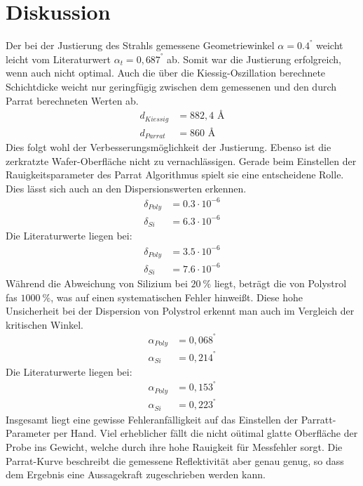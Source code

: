 \section{Diskussion}
\label{sec:Diskussion}

Der bei der Justierung des Strahls gemessene Geometriewinkel $\alpha = 0.4^°$ weicht leicht vom Literaturwert $\alpha_{t} = 0,687^°$ ab.
Somit war die Justierung erfolgreich, wenn auch nicht optimal.
Auch die über die Kiessig-Oszillation berechnete Schichtdicke weicht nur geringfügig zwischen dem gemessenen 
und den durch Parrat berechneten Werten ab.
\begin{align*}
    d_{Kiessig} &= 882,4 \text{ \AA} \\
    d_{Parrat} &= 860 \text{ \AA}
\end{align*}
Dies folgt wohl der Verbesserungsmöglichkeit der Justierung.
Ebenso ist die zerkratzte Wafer-Oberfläche nicht zu vernachlässigen.
Gerade beim Einstellen der Rauigkeitsparameter des Parrat Algorithmus spielt sie eine entscheidene Rolle.
Dies lässt sich auch an den Dispersionswerten erkennen.
\begin{align*}
    \delta_{Poly} &= 0.3 \cdot 10^{-6}\\
    \delta_{Si} &= 6.3 \cdot 10^{-6} 
\end{align*}
Die Literaturwerte \cite{wert} liegen bei:
\begin{align*}
    \delta_{Poly} &= 3.5 \cdot 10^{-6}\\
    \delta_{Si} &= 7.6 \cdot 10^{-6}
\end{align*}
Während die Abweichung von Silizium bei $\qty{20}{\percent}$ liegt, beträgt die von Polystrol fas $\qty{1000}{\percent}$,
was auf einen systematischen Fehler hinweißt.
Diese hohe Unsicherheit bei der Dispersion von Polystrol erkennt man auch im Vergleich der kritischen Winkel.
\begin{align*}
    \alpha_{Poly} &= 0,068^°  \\
    \alpha_{Si} &= 0,214^°
\end{align*}
Die Literaturwerte \cite{wert} liegen bei:
\begin{align*}
    \alpha_{Poly} &= 0,153^°  \\
    \alpha_{Si} &= 0,223^°
\end{align*}
Insgesamt liegt eine gewisse Fehleranfälligkeit auf das Einstellen der Parratt-Parameter per Hand.
Viel erheblicher fällt die nicht oütimal glatte Oberfläche der Probe ins Gewicht,
welche durch ihre hohe Rauigkeit für Messfehler sorgt. 
Die Parrat-Kurve beschreibt die gemessene Reflektivität aber genau genug, 
so dass dem Ergebnis eine Aussagekraft zugeschrieben werden kann.